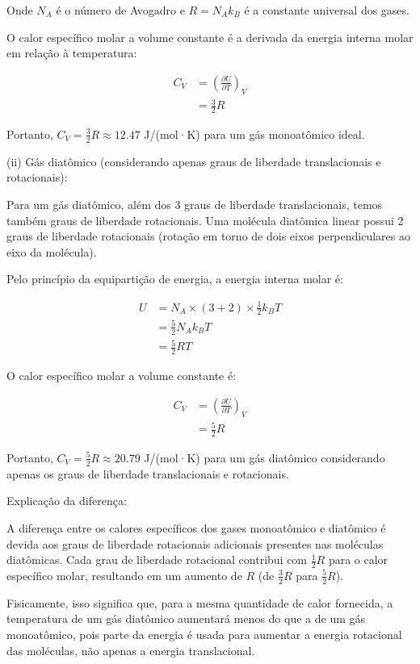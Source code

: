 \documentclass[fleqn,a4paper]{article}
\begin{document}
Onde $N_A$ é o número de Avogadro e $R = N_A k_B$ é a constante universal dos gases.

O calor específico molar a volume constante é a derivada da energia interna molar em relação à temperatura:

\begin{align}
C_V &= \left(\frac{\partial U}{\partial T}\right)_V \\
&= \frac{3}{2}R
\end{align}

Portanto, $C_V = \frac{3}{2}R \approx 12.47$ J/(mol·K) para um gás monoatômico ideal.

(ii) Gás diatômico (considerando apenas graus de liberdade translacionais e rotacionais):

Para um gás diatômico, além dos 3 graus de liberdade translacionais, temos também graus de liberdade rotacionais. Uma molécula diatômica linear possui 2 graus de liberdade rotacionais (rotação em torno de dois eixos perpendiculares ao eixo da molécula).

Pelo princípio da equipartição de energia, a energia interna molar é:

\begin{align}
U &= N_A \times (3 + 2) \times \frac{1}{2}k_B T \\
&= \frac{5}{2}N_A k_B T \\
&= \frac{5}{2}RT
\end{align}

O calor específico molar a volume constante é:

\begin{align}
C_V &= \left(\frac{\partial U}{\partial T}\right)_V \\
&= \frac{5}{2}R
\end{align}

Portanto, $C_V = \frac{5}{2}R \approx 20.79$ J/(mol·K) para um gás diatômico considerando apenas os graus de liberdade translacionais e rotacionais.

Explicação da diferença:

A diferença entre os calores específicos dos gases monoatômico e diatômico é devida aos graus de liberdade rotacionais adicionais presentes nas moléculas diatômicas. Cada grau de liberdade rotacional contribui com $\frac{1}{2}R$ para o calor específico molar, resultando em um aumento de $R$ (de $\frac{3}{2}R$ para $\frac{5}{2}R$).

Fisicamente, isso significa que, para a mesma quantidade de calor fornecida, a temperatura de um gás diatômico aumentará menos do que a de um gás monoatômico, pois parte da energia é usada para aumentar a energia rotacional das moléculas, não apenas a energia translacional.
\end{document}
